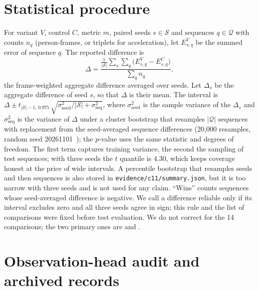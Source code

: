 \documentclass[10pt,onecolumn,letterpaper]{article}
\begin{document}
\section{Statistical procedure}
\label{sec:stats}

For variant $V$, control $C$, metric $m$, paired seeds $s\in\mathcal S$ and sequences $q\in\mathcal Q$ with counts $n_q$ (person-frames, or triplets for acceleration), let $E^{V}_{s,q}$ be the summed error of sequence $q$.
The reported difference is
\begin{equation}
  \Delta = \frac{\frac{1}{|\mathcal S|}\sum_{s}\sum_{q}\big(E^{V}_{s,q}-E^{C}_{s,q}\big)}{\sum_{q} n_q},
\end{equation}
\ie the frame-weighted aggregate difference averaged over seeds.
Let $\Delta_s$ be the aggregate difference of seed $s$, so that $\Delta$ is their mean.
The interval is $\Delta \pm t_{|\mathcal S|-1,\,0.975}\,\sqrt{\sigma^2_{\text{seed}}/|\mathcal S| + \sigma^2_{\text{seq}}}$, where $\sigma^2_{\text{seed}}$ is the sample variance of the $\Delta_s$ and $\sigma^2_{\text{seq}}$ is the variance of $\Delta$ under a cluster bootstrap that resamples $|\mathcal Q|$ sequences with replacement from the seed-averaged sequence differences (20,000 resamples, random seed 20261101~\cite{efron1993bootstrap}); the $p$-value uses the same statistic and degrees of freedom.
The first term captures training variance, the second the sampling of test sequences; with three seeds the $t$ quantile is $4.30$, which keeps coverage honest at the price of wide intervals.
A percentile bootstrap that resamples seeds and then sequences is also stored in \texttt{evidence/c11/summary.json}, but it is too narrow with three seeds and is not used for any claim.
``Wins'' counts sequences whose seed-averaged difference is negative.
We call a difference reliable only if its interval excludes zero and all three seeds agree in sign; this rule and the list of comparisons were fixed before test evaluation.
We do not correct for the 14 comparisons; the two primary ones are  \vs {} and  \vs {}.

\section{Observation-head audit and archived records}
\label{sec:audit}
\end{document}
